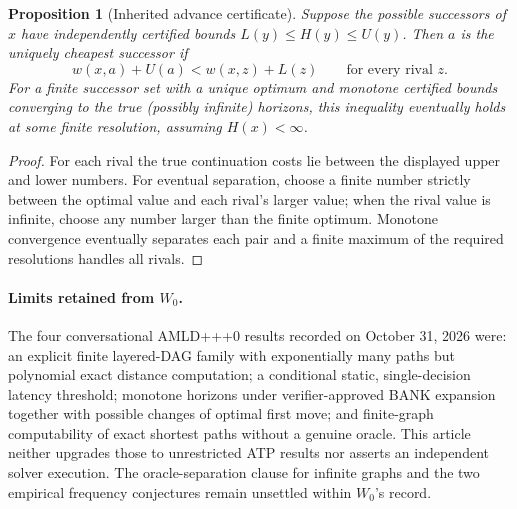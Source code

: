 \documentclass[11pt]{article}
\newtheorem{proposition}[theorem]{Proposition}
\theoremstyle{definition}\newtheorem{definition}[theorem]{Definition}\newtheorem{assumption}[theorem]{Assumption}
\theoremstyle{remark}\newtheorem{remark}[theorem]{Remark}
\begin{document}
\begin{proposition}[Inherited advance certificate]\label{prop:advance}
Suppose the possible successors of $x$ have independently certified bounds $L(y)\leq H(y)\leq U(y)$. Then $a$ is the uniquely cheapest successor if
\[
w(x,a)+U(a)<w(x,z)+L(z)\qquad\text{for every rival }z.
\]
For a finite successor set with a unique optimum and monotone certified bounds converging to the true (possibly infinite) horizons, this inequality eventually holds at some finite resolution, assuming $H(x)<\infty$.
\end{proposition}
\begin{proof}
For each rival the true continuation costs lie between the displayed upper and lower numbers. For eventual separation, choose a finite number strictly between the optimal value and each rival's larger value; when the rival value is infinite, choose any number larger than the finite optimum. Monotone convergence eventually separates each pair and a finite maximum of the required resolutions handles all rivals.
\end{proof}
\par


\paragraph{Limits retained from $W_0$.} The four conversational AMLD+++0 results recorded on October 31, 2026 were: an explicit finite layered-DAG family with exponentially many paths but polynomial exact distance computation; a conditional static, single-decision latency threshold; monotone horizons under verifier-approved BANK expansion together with possible changes of optimal first move; and finite-graph computability of exact shortest paths without a genuine oracle. This article neither upgrades those to unrestricted ATP results nor asserts an independent solver execution. The oracle-separation clause for infinite graphs and the two empirical frequency conjectures remain unsettled within $W_0$'s record.
\end{document}
